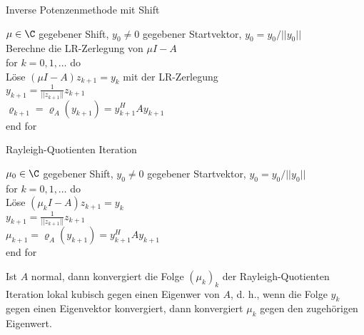 \begin{karte}{Inverse Potenzenmethode mit Shift}
    \begin{tabbing}
        \( \mu \in \C \) gegebener Shift, \(y_0 \neq 0\) gegebener Startvektor, \(y_0 = y_0 / ||y_0||\) \\
        Berechne die LR-Zerlegung von \( \mu I - A \)\\
        for \= \( k = 0,1,\ldots \) do \\
        \> Löse \( (\mu I - A) z_{k+1} = y_k \) mit der LR-Zerlegung \\
        \> \( y_{k+1} = \frac{1}{||z_{k+1}||} z_{k+1}\) \\
        \> \( \varrho_{k+1} = \varrho_A(y_{k+1}) = y_{k+1}^H A y_{k+1} \) \\
        end for
    \end{tabbing}
\end{karte}

\begin{karte}{Rayleigh-Quotienten Iteration}
    \begin{tabbing}
        \( \mu_0 \in \C \) gegebener Shift, \(y_0 \neq 0\) gegebener Startvektor, \(y_0 = y_0 / ||y_0||\) \\
        for \= \( k = 0,1,\ldots \) do \\
        \> Löse \( (\mu_k I - A) z_{k+1} = y_k \) \\
        \> \( y_{k+1} = \frac{1}{||z_{k+1}||} z_{k+1}\) \\
        \> \( \mu_{k+1} = \varrho_A(y_{k+1}) = y_{k+1}^H A y_{k+1} \) \\
        end for
    \end{tabbing}
    
    Ist \(A\) normal, dann konvergiert die Folge \( (\mu_k)_k \) der Rayleigh-Quotienten Iteration 
    lokal kubisch gegen einen Eigenwer von \(A\), d. h., wenn die Folge \(y_k\) gegen einen Eigenvektor 
    konvergiert, dann konvergiert \(\mu_k\) gegen den zugehörigen Eigenwert.
\end{karte}